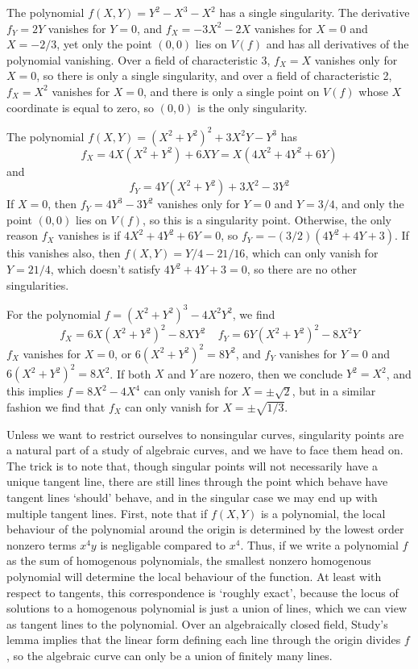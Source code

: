 \begin{example}
    The polynomial $f(X,Y) = Y^2 - X^3 - X^2$ has a single singularity. The derivative $f_Y = 2Y$ vanishes for $Y = 0$, and $f_X = -3X^2 - 2X$ vanishes for $X = 0$ and $X = -2/3$, yet only the point $(0,0)$ lies on $V(f)$ and has all derivatives of the polynomial vanishing. Over a field of characteristic 3, $f_X = X$ vanishes only for $X = 0$, so there is only a single singularity, and over a field of characteristic 2, $f_X = X^2$ vanishes for $X = 0$, and there is only a single point on $V(f)$ whose $X$ coordinate is equal to zero, so $(0,0)$ is the only singularity.
\end{example}

\begin{example}
    The polynomial $f(X,Y) = (X^2 + Y^2)^2 + 3X^2Y - Y^3$ has
    \[ f_X = 4X(X^2 + Y^2) + 6XY = X(4X^2 + 4Y^2 + 6Y) \]
    and
    \[ f_Y = 4Y(X^2 + Y^2) + 3X^2 - 3Y^2 \]
    If $X = 0$, then $f_Y = 4Y^3 - 3Y^2$ vanishes only for $Y = 0$ and $Y = 3/4$, and only the point $(0,0)$ lies on $V(f)$, so this is a singularity point. Otherwise, the only reason $f_X$ vanishes is if $4X^2 + 4Y^2 + 6Y = 0$, so $f_Y = -(3/2)(4Y^2 + 4Y + 3)$. If this vanishes also, then $f(X,Y) = Y/4 - 21/16$, which can only vanish for $Y = 21/4$, which doesn't satisfy $4Y^2 + 4Y + 3 = 0$, so there are no other singularities.
\end{example}

\begin{example}
    For the polynomial $f = (X^2 + Y^2)^3 - 4X^2Y^2$, we find
    \[ f_X = 6X(X^2 + Y^2)^2 - 8XY^2\ \ \ \ \ f_Y = 6Y(X^2 + Y^2)^2 - 8X^2Y \]
    $f_X$ vanishes for $X = 0$, or $6(X^2 + Y^2)^2 = 8Y^2$, and $f_Y$ vanishes for $Y = 0$ and $6(X^2 + Y^2)^2 = 8X^2$. If both $X$ and $Y$ are nozero, then we conclude $Y^2 = X^2$, and this implies $f = 8X^2 - 4X^4$ can only vanish for $X = \pm \sqrt{2}$, but in a similar fashion we find that $f_X$ can only vanish for $X = \pm \sqrt{1/3}$.
\end{example}

Unless we want to restrict ourselves to nonsingular curves, singularity points are a natural part of a study of algebraic curves, and we have to face them head on. The trick is to note that, though singular points will not necessarily have a unique tangent line, there are still lines through the point which behave have tangent lines `should' behave, and in the singular case we may end up with multiple tangent lines. First, note that if $f(X,Y)$ is a polynomial, the local behaviour of the polynomial around the origin is determined by the lowest order nonzero terms $x^4y$ is negligable compared to $x^4$. Thus, if we write a polynomial $f$ as the sum of homogenous polynomials, the smallest nonzero homogenous polynomial will determine the local behaviour of the function. At least with respect to tangents, this correspondence is `roughly exact', because the locus of solutions to a homogenous polynomial is just a union of lines, which we can view as tangent lines to the polynomial. Over an algebraically closed field, Study's lemma implies that the linear form defining each line through the origin divides $f$, so the algebraic curve can only be a union of finitely many lines.

